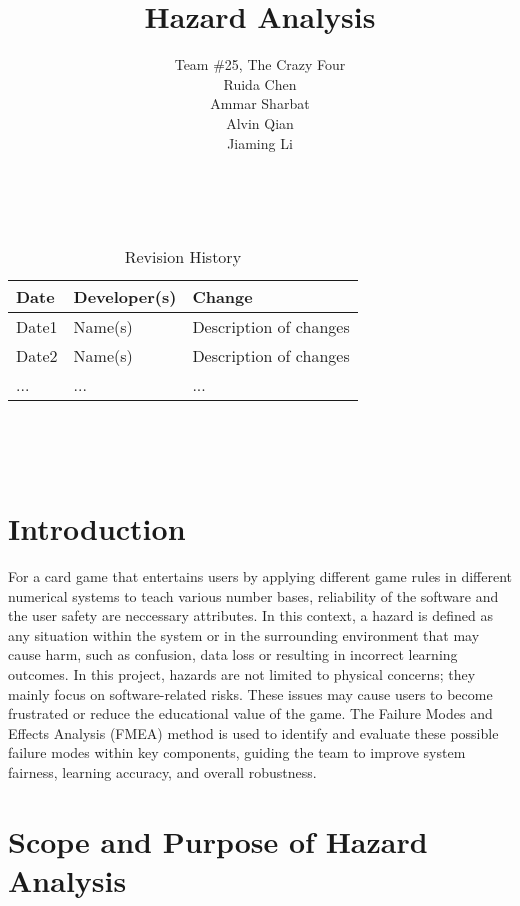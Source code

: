 \documentclass{article}
\title{Hazard Analysis\\\progname}
\author{
    Team \#25, The Crazy Four \\[1ex]
    Ruida Chen \\
    Ammar Sharbat \\
    Alvin Qian \\
    Jiaming Li
}
\date{}
\begin{document}
\maketitle
\thispagestyle{empty}

~\newpage


\begin{table}[hp]
\caption{Revision History} \label{TblRevisionHistory}
\begin{tabularx}{\textwidth}{llX}
\toprule
\textbf{Date} & \textbf{Developer(s)} & \textbf{Change}\\
\midrule
Date1 & Name(s) & Description of changes\\
Date2 & Name(s) & Description of changes\\
... & ... & ...\\
\bottomrule
\end{tabularx}
\end{table}

~\newpage

\tableofcontents

~\newpage



\section{Introduction}

For a card game that entertains users by applying different game rules in different numerical systems to teach various number bases, reliability of the software and the user safety are neccessary attributes. In this context, a hazard is defined as any situation within the system or in the surrounding environment that may cause harm, such as confusion, data loss or resulting in incorrect learning outcomes. In this project, hazards are not limited to physical concerns; they mainly focus on software-related risks. These issues may cause users to become frustrated or reduce the educational value of the game. The Failure Modes and Effects Analysis (FMEA) method is used to identify and evaluate these possible failure modes within key components, guiding the team to improve system fairness, learning accuracy, and overall robustness.

\section{Scope and Purpose of Hazard Analysis}
\end{document}
